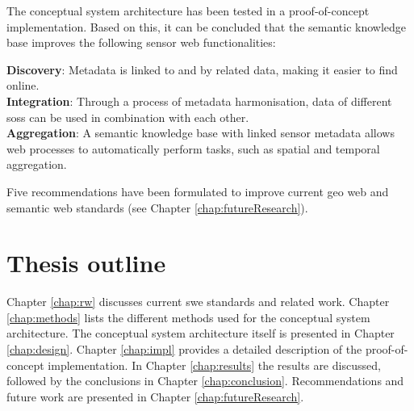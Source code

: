 \noindent The conceptual system architecture has been tested in a proof-of-concept implementation. Based on this, it can be concluded that the semantic knowledge base improves the following sensor web functionalities:\\
\begin{addmargin}[0.5cm]{0cm}
	\textbf{Discovery}: Metadata is linked to and by related data, making it easier to find online.\\
	\textbf{Integration}: Through a process of metadata harmonisation, data of different \aclp{sos} can be used in combination with each other.  \\
	\textbf{Aggregation}: A semantic knowledge base with linked sensor metadata allows web processes to automatically perform tasks, such as spatial and temporal aggregation. \\
\end{addmargin}

\noindent Five recommendations have been formulated to improve current geo web and semantic web standards (see Chapter \ref{chap:futureResearch}).

\section{Thesis outline}
Chapter \ref{chap:rw} discusses current \ac{swe} standards and related work. Chapter \ref{chap:methods} lists the different methods used for the conceptual system architecture. The conceptual system architecture itself is presented in Chapter \ref{chap:design}. Chapter \ref{chap:impl} provides a detailed description of the proof-of-concept implementation. In Chapter \ref{chap:results} the results are discussed, followed by the conclusions in Chapter \ref{chap:conclusion}. Recommendations and future work are presented in Chapter \ref{chap:futureResearch}.      






